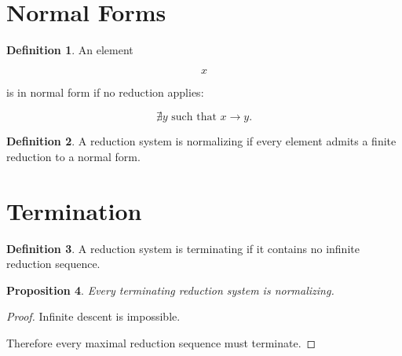\documentclass[11pt]{book}
\numberwithin{equation}{chapter}
\theoremstyle{definition}
\newtheorem{definition}{Definition}[chapter]
\theoremstyle{plain}
\newtheorem{proposition}[definition]{Proposition}
\begin{document}

\section{Normal Forms}

\begin{definition}

An element

\[
x
\]

is in normal form if no reduction applies:

\[
\nexists y
\text{ such that }
x\rightarrow y.
\]

\end{definition}


\begin{definition}

A reduction system is normalizing if every element admits a finite
reduction to a normal form.

\end{definition}


\section{Termination}

\begin{definition}

A reduction system is terminating if it contains no infinite reduction
sequence.

\end{definition}


\begin{proposition}

Every terminating reduction system is normalizing.

\end{proposition}

\begin{proof}

Infinite descent is impossible.

Therefore every maximal reduction sequence must terminate.

\end{proof}
\end{document}
